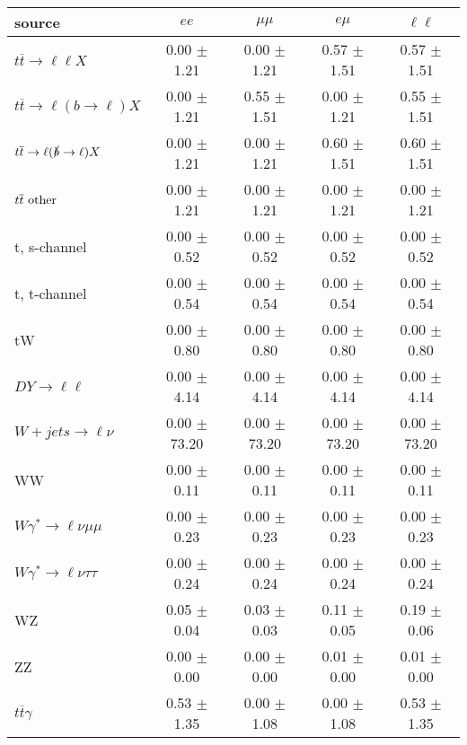\begin{tabular}{l|cccc} \hline\hline
source & $ee$ & $\mu\mu$ & $e\mu$ & $\ell\ell $ \\
\hline
$t\overline{t} \rightarrow \ell \ell X$ &  0.00 $\pm$  1.21 &  0.00 $\pm$  1.21 &  0.57 $\pm$  1.51 &  0.57 $\pm$  1.51 \\
$t\overline{t} \rightarrow \ell (b \rightarrow \ell) X$ &  0.00 $\pm$  1.21 &  0.55 $\pm$  1.51 &  0.00 $\pm$  1.21 &  0.55 $\pm$  1.51 \\
$t\overline{t} \rightarrow \ell (\slashed b \rightarrow \ell) X$ &  0.00 $\pm$  1.21 &  0.00 $\pm$  1.21 &  0.60 $\pm$  1.51 &  0.60 $\pm$  1.51 \\
        $t\overline{t}\ \rm{other}$ &  0.00 $\pm$  1.21 &  0.00 $\pm$  1.21 &  0.00 $\pm$  1.21 &  0.00 $\pm$  1.21 \\
\hline
                       t, s-channel &  0.00 $\pm$  0.52 &  0.00 $\pm$  0.52 &  0.00 $\pm$  0.52 &  0.00 $\pm$  0.52 \\
                       t, t-channel &  0.00 $\pm$  0.54 &  0.00 $\pm$  0.54 &  0.00 $\pm$  0.54 &  0.00 $\pm$  0.54 \\
                                 tW &  0.00 $\pm$  0.80 &  0.00 $\pm$  0.80 &  0.00 $\pm$  0.80 &  0.00 $\pm$  0.80 \\
\hline
         $DY \rightarrow \ell \ell$ &  0.00 $\pm$  4.14 &  0.00 $\pm$  4.14 &  0.00 $\pm$  4.14 &  0.00 $\pm$  4.14 \\
      $W+jets \rightarrow \ell \nu$ &  0.00 $\pm$ 73.20 &  0.00 $\pm$ 73.20 &  0.00 $\pm$ 73.20 &  0.00 $\pm$ 73.20 \\
                                 WW &  0.00 $\pm$  0.11 &  0.00 $\pm$  0.11 &  0.00 $\pm$  0.11 &  0.00 $\pm$  0.11 \\
\hline
$W\gamma^{*} \rightarrow \ell \nu \mu\mu$ &  0.00 $\pm$  0.23 &  0.00 $\pm$  0.23 &  0.00 $\pm$  0.23 &  0.00 $\pm$  0.23 \\
$W\gamma^{*} \rightarrow \ell \nu \tau\tau$ &  0.00 $\pm$  0.24 &  0.00 $\pm$  0.24 &  0.00 $\pm$  0.24 &  0.00 $\pm$  0.24 \\
                                 WZ &  0.05 $\pm$  0.04 &  0.03 $\pm$  0.03 &  0.11 $\pm$  0.05 &  0.19 $\pm$  0.06 \\
                                 ZZ &  0.00 $\pm$  0.00 &  0.00 $\pm$  0.00 &  0.01 $\pm$  0.00 &  0.01 $\pm$  0.00 \\
\hline
              $t\overline{t}\gamma$ &  0.53 $\pm$  1.35 &  0.00 $\pm$  1.08 &  0.00 $\pm$  1.08 &  0.53 $\pm$  1.35 \\

\end{tabular}
